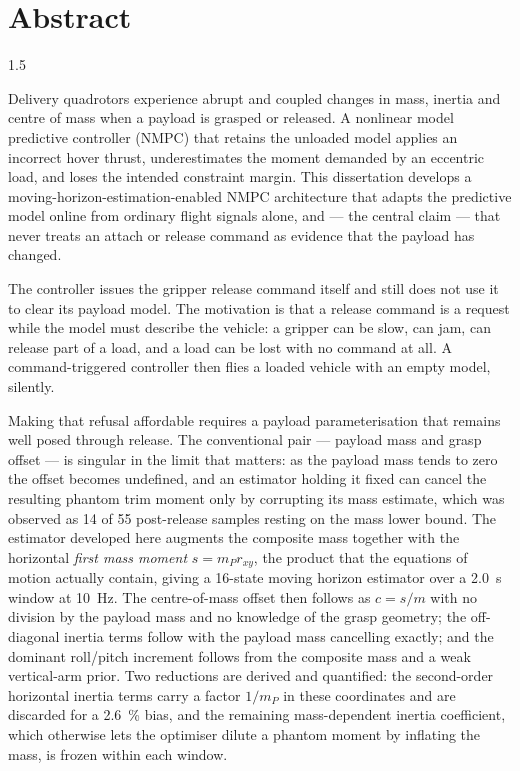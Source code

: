 \newpage
\chapter*{\centering Abstract}

\begin{spacing}{1.5}
\setlength{\parskip}{0.18in}

Delivery quadrotors experience abrupt and coupled changes in mass, inertia and
centre of mass when a payload is grasped or released. A nonlinear model
predictive controller (NMPC) that retains the unloaded model applies an incorrect
hover thrust, underestimates the moment demanded by an eccentric load, and loses
the intended constraint margin. This dissertation develops a
moving-horizon-estimation-enabled NMPC architecture that adapts the predictive
model online from ordinary flight signals alone, and --- the central claim ---
that never treats an attach or release command as evidence that the payload has
changed.

The controller issues the gripper release command itself and still does not use
it to clear its payload model. The motivation is that a release command is a
request while the model must describe the vehicle: a gripper can be slow, can
jam, can release part of a load, and a load can be lost with no command at all.
A command-triggered controller then flies a loaded vehicle with an empty model,
silently.

Making that refusal affordable requires a payload parameterisation that remains
well posed through release. The conventional pair --- payload mass and grasp
offset --- is singular in the limit that matters: as the payload mass tends to
zero the offset becomes undefined, and an estimator holding it fixed can cancel
the resulting phantom trim moment only by corrupting its mass estimate, which was
observed as 14 of 55 post-release samples resting on the mass lower bound. The
estimator developed here augments the composite mass together with the horizontal
\emph{first mass moment} $s=m_P r_{xy}$, the product that the equations of motion
actually contain, giving a 16-state moving horizon estimator over a
\SI{2.0}{\second} window at \SI{10}{\hertz}. The centre-of-mass offset then
follows as $c=s/m$ with no division by the payload mass and no knowledge of the
grasp geometry; the off-diagonal inertia terms follow with the payload mass
cancelling exactly; and the dominant roll/pitch increment follows from the
composite mass and a weak vertical-arm prior. Two reductions are derived and
quantified: the second-order horizontal inertia terms carry a factor $1/m_P$ in
these coordinates and are discarded for a \SI{2.6}{\percent} bias, and the
remaining mass-dependent inertia coefficient, which otherwise lets the optimiser
dilute a phantom moment by inflating the mass, is frozen within each window.


\end{spacing}
